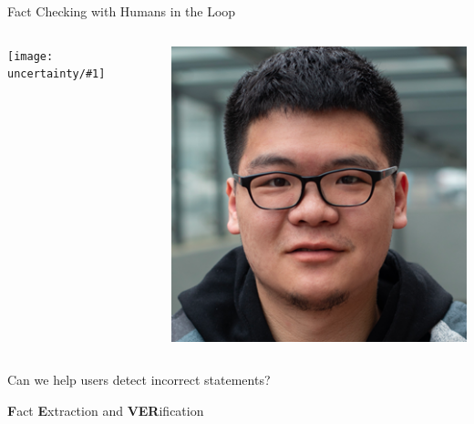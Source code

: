 \documentclass[compress]{beamer}
\newcommand{\fsi}[2]{
\begin{frame}[plain]
\vspace*{-1pt}
\makebox[\linewidth]{\texttt{[image: \#1]}}
\begin{center}
#2
\end{center}
\end{frame}
}
\newcommand{\gfxu}[2]{
	\begin{center}
		\texttt{[image: uncertainty/\#1]}
	\end{center}
}
\begin{document}
\begin{frame}{Fact Checking with Humans in the Loop}
	\begin{columns}

\gfxu{paper_convincingly}{.9}

\begin{center}
\includegraphics[width=1.0\linewidth]{general_figures/chenglei}		
	
\end{center}
	\end{columns}
	Can we help users detect incorrect statements?
	
\end{frame}

  \fsi{uncertainty/fever}{\textbf{F}act \textbf{E}xtraction and \textbf{VER}ification}
  		
\end{document}
